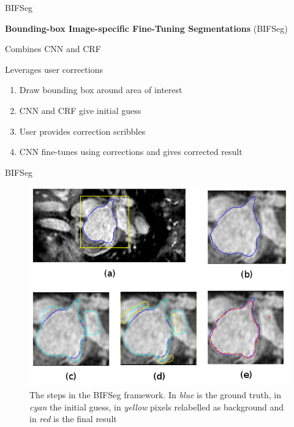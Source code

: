 \documentclass[10pt]{beamer}
\begin{document}
\begin{frame}[fragile]{BIFSeg}

  \textbf{Bounding-box Image-specific Fine-Tuning Segmentations} (BIFSeg) \cite{BIFSeg}

  Combines CNN and CRF

  Leverages user corrections
  
  \begin{enumerate}
  \item Draw bounding box around area of interest
  \item CNN and CRF give initial guess
  \item User provides correction scribbles
  \item CNN fine-tunes using corrections and gives corrected result
  \end{enumerate}
  
\end{frame}

\begin{frame}[fragile]{BIFSeg}

  \begin{figure}[h!]
    \centering
    \includegraphics[scale=0.46]{pictures/heartBifSeg2}
    \caption{The steps in the BIFSeg framework. In \textit{blue} is the ground truth, in \textit{cyan} the initial guess,
      in \textit{yellow} pixels relabelled as background and in \textit{red} is the final result}
    \label{fig:minCut}
  \end{figure}
  
\end{frame}
\end{document}
